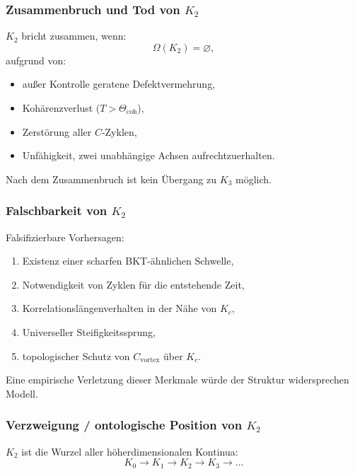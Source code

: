 \subsubsection{Zusammenbruch und Tod von \texorpdfstring{$K_2$}{K_2}}

$K_2$ bricht zusammen, wenn:
\[
\Omega(K_2) = \varnothing,
\]
aufgrund von:
\begin{itemize}
    \item außer Kontrolle geratene Defektvermehrung,
    \item Kohärenzverlust ($T > \Theta_{\mathrm{coh}}$),
    \item Zerstörung aller $C$-Zyklen,
    \item Unfähigkeit, zwei unabhängige Achsen aufrechtzuerhalten.
\end{itemize}

Nach dem Zusammenbruch ist kein Übergang zu $K_3$ möglich.

\subsubsection{Falschbarkeit von \texorpdfstring{$K_2$}{K_2}}

Falsifizierbare Vorhersagen:
\begin{enumerate}
    \item Existenz einer scharfen BKT-ähnlichen Schwelle,
    \item Notwendigkeit von Zyklen für die entstehende Zeit,
    \item Korrelationslängenverhalten in der Nähe von $K_c$,
    \item Universeller Steifigkeitssprung,
    \item topologischer Schutz von $C_{\mathrm{vortex}}$ über $K_c$.
\end{enumerate}

Eine empirische Verletzung dieser Merkmale würde der Struktur widersprechen
Modell.

\subsubsection{Verzweigung / ontologische Position von \texorpdfstring{$K_2$}{K_2}}

$K_2$ ist die Wurzel aller höherdimensionalen Kontinua:
\[
K_0 \to K_1 \to K_2 \to K_3 \to \dots
\]

